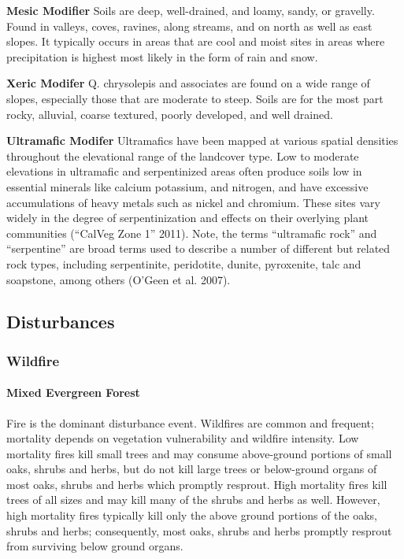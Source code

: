 \begin{adjustwidth}{2cm}{}
\textbf{Mesic Modifier }
Soils are deep, well-drained, and loamy, sandy, or gravelly. Found in valleys, coves, ravines, along streams, and on north as well as east slopes. It typically occurs in areas that are cool and moist sites in areas where precipitation is highest most likely in the form of rain and snow.

\medskip
\noindent \textbf{Xeric Modifer}
Q. chrysolepis and associates are found on a wide range of slopes, especially those that are moderate to steep. Soils are for the most part rocky, alluvial, coarse textured, poorly developed, and well drained. 

\medskip
\noindent \textbf{Ultramafic Modifer} Ultramafics have been mapped at various spatial densities throughout the elevational range of the landcover type. Low to moderate elevations in ultramafic and serpentinized areas often produce soils low in essential minerals like calcium potassium, and nitrogen, and have excessive accumulations of heavy metals such as nickel and chromium. These sites vary widely in the degree of serpentinization and effects on their overlying plant communities (``CalVeg Zone 1'' 2011). Note, the terms ``ultramafic rock'' and ``serpentine'' are broad terms used to describe a number of different but related rock types, including serpentinite, peridotite, dunite, pyroxenite, talc and soapstone, among others (O’Geen et al. 2007). 

\end{adjustwidth}


\subsection*{Disturbances}
\subsubsection{Wildfire}

\paragraph{Mixed Evergreen Forest}		Fire is the dominant disturbance event. Wildfires are common and frequent; mortality depends on vegetation vulnerability and wildfire intensity. Low mortality fires kill small trees and may consume above-ground portions of small oaks, shrubs and herbs, but do not kill large trees or below-ground organs of most oaks, shrubs and herbs which promptly resprout. High mortality fires kill trees of all sizes and may kill many of the shrubs and herbs as well. However, high mortality fires typically kill only the above ground portions of the oaks, shrubs and herbs; consequently, most oaks, shrubs and herbs promptly resprout from surviving below ground organs.

